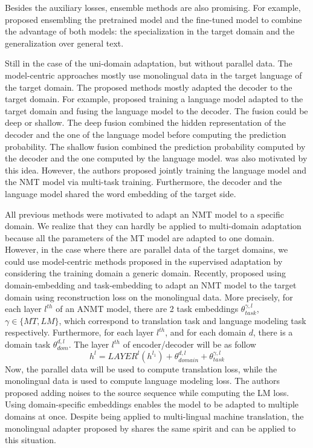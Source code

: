 Besides the auxiliary losses, ensemble methods are also promising. For example, \citet{Freitag16fast} proposed ensembling the pretrained model and the fine-tuned model to combine the advantage of both models: the specialization in the target domain and the generalization over general text.

Still in the case of the uni-domain adaptation, but without parallel data. The model-centric approaches mostly use monolingual data in the target language of the target domain. The proposed methods mostly adapted the decoder to the target domain. For example, \citet{Gulcehre16monolingual} proposed training a language model adapted to the target domain and fusing the language model to the decoder. The fusion could be deep or shallow. The deep fusion combined the hidden representation of the decoder and the one of the language model before computing the prediction probability. The shallow fusion combined the prediction probability computed by the decoder and the one computed by the language model. \citet{Domhan17using} was also motivated by this idea. However, the authors proposed jointly training the language model and the NMT model via multi-task training. Furthermore, the decoder and the language model shared the word embedding of the target side.

All previous methods were motivated to adapt an NMT model to a specific domain. We realize that they can hardly be applied to multi-domain adaptation because all the parameters of the MT model are adapted to one domain. However, in the case where there are parallel data of the target domains, we could use model-centric methods proposed in the supervised adaptation by considering the training domain a generic domain. Recently, \cite{Dou19unsupervised} proposed using domain-embedding and task-embedding to adapt an NMT model to the target domain using reconstruction loss on the monolingual data. More precisely, for each layer $l^{th}$ of an ANMT model, there are 2 task embeddings $\theta_{task}^{\gamma,l}$, $\gamma \in \{ MT, LM \}$, which correspond to translation task and language modeling task respectively. Furthermore, for each layer $l^{th}$, and for each domain $d$, there is a domain task $\theta^{d,l}_{dom}$. The layer $l^{th}$ of encoder/decoder will be as follow
\begin{equation}
h^{l} = LAYER^l(h^{l_1}) + \theta^{d,l}_{domain} + \theta_{task}^{\gamma,l}
\end{equation}
Now, the parallel data will be used to compute translation loss, while the monolingual data is used to compute language modeling loss. The authors proposed adding noises to the source sequence while computing the LM loss. Using domain-specific embeddings enables the model to be adapted to multiple domains at once. Despite being applied to multi-lingual machine translation, the monolingual adapter proposed by \citet{Philip20monolingual} shares the same spirit and can be applied to this situation.
